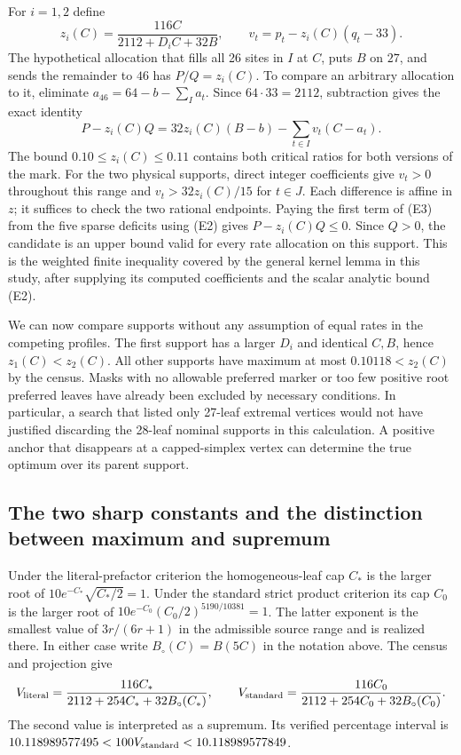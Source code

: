 For \(i=1,2\) define
\[
 z_i(C)=\frac{116C}{2112+D_i C+32B},\qquad
 v_t=p_t-z_i(C)(q_t-33).
\]
The hypothetical allocation that fills all 26 sites in \(I\) at \(C\), puts \(B\) on \(27\), and sends the remainder to \(46\) has \(P/Q=z_i(C)\). To compare an arbitrary allocation to it, eliminate \(a_{46}=64-b-\sum_{I}a_t\). Since \(64\cdot33=2112\), subtraction gives the exact identity
\[
 P-z_i(C)Q
   =32z_i(C)(B-b)-\sum_{t\in I}v_t(C-a_t).
 \tag{E3}
\]
The bound \(0.10\le z_i(C)\le0.11\) contains both critical ratios for both versions of the mark. For the two physical supports, direct integer coefficients give \(v_t>0\) throughout this range and \(v_t>32z_i(C)/15\) for \(t\in J\). Each difference is affine in \(z\); it suffices to check the two rational endpoints. Paying the first term of (E3) from the five sparse deficits using (E2) gives \(P-z_i(C)Q\le0\). Since \(Q>0\), the candidate is an upper bound valid for every rate allocation on this support. This is the weighted finite inequality covered by the general kernel lemma in this study, after supplying its computed coefficients and the scalar analytic bound (E2).

We can now compare supports without any assumption of equal rates in the competing profiles. The first support has a larger \(D_i\) and identical \(C,B\), hence \(z_1(C)<z_2(C)\). All other supports have maximum at most \(0.10118<z_2(C)\) by the census. Masks with no allowable preferred marker or too few positive root preferred leaves have already been excluded by necessary conditions. In particular, a search that listed only 27-leaf extremal vertices would not have justified discarding the 28-leaf nominal supports in this calculation. A positive anchor that disappears at a capped-simplex vertex can determine the true optimum over its parent support.

\subsection{The two sharp constants and the distinction between maximum and supremum}

Under the literal-prefactor criterion the homogeneous-leaf cap \(C_*\) is the larger root of \(10 e^{-C_*}\sqrt{C_*/2}=1\). Under the standard strict product criterion its cap \(C_0\) is the larger root of \(10 e^{-C_0}(C_0/2)^{5190/10381}=1\). The latter exponent is the smallest value of \(3r/(6r+1)\) in the admissible source range and is realized there. In either case write \(B_{\circ}(C)=B(5C)\) in the notation above. The census and projection give
\[
 V_{\rm literal}=\frac{116C_*}{2112+254C_*+32B_{\circ}(C_*)},\qquad
 V_{\rm standard}=\frac{116C_0}{2112+254C_0+32B_{\circ}(C_0)}.
\]
The second value is interpreted as a supremum. Its verified percentage interval is
\(10.118989577495<100V_{\rm standard}<10.118989577849\).

